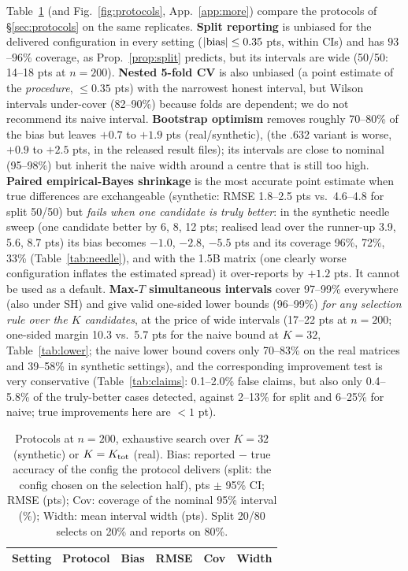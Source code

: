 Table~\ref{tab:protocols} (and Fig.~\ref{fig:protocols}, App.~\ref{app:more}) compare the protocols of \S\ref{sec:protocols} on the same replicates. 
\textbf{Split reporting} is unbiased for the delivered configuration in every setting ($|{\rm bias}|\le0.35$ pts, within CIs) and has $93$--$96\%$ coverage, as Prop.~\ref{prop:split} predicts, but its intervals are wide (50/50: 14--18 pts at $n=200$).
\textbf{Nested 5-fold CV} is also unbiased (a point estimate of the \emph{procedure}, $\le0.35$ pts) with the narrowest honest interval, but Wilson intervals under-cover (82--90\%) because folds are dependent; we do not recommend its naive interval.
\textbf{Bootstrap optimism} removes roughly 70--80\% of the bias but leaves $+0.7$ to $+1.9$ pts (real/synthetic), (the .632 variant is worse, $+0.9$ to $+2.5$ pts, in the released result files); its intervals are close to nominal (95--98\%) but inherit the naive width around a centre that is still too high.
\textbf{Paired empirical-Bayes shrinkage} is the most accurate point estimate when true differences are exchangeable (synthetic: RMSE 1.8--2.5 pts vs.\ 4.6--4.8 for split 50/50) but \emph{fails when one candidate is truly better}: in the synthetic needle sweep (one candidate better by 6, 8, 12 pts; realised lead over the runner-up 3.9, 5.6, 8.7 pts) its bias becomes $-1.0$, $-2.8$, $-5.5$ pts and its coverage 96\%, 72\%, 33\% (Table~\ref{tab:needle}), and with the 1.5B matrix (one clearly worse configuration inflates the estimated spread) it over-reports by $+1.2$ pts. It cannot be used as a default.
\textbf{Max-$T$ simultaneous intervals} cover 97--99\% everywhere (also under SH) and give valid one-sided lower bounds (96--99\%) \emph{for any selection rule over the $K$ candidates}, at the price of wide intervals (17--22 pts at $n=200$; one-sided margin 10.3 vs.\ 5.7 pts for the naive bound at $K{=}32$, Table~\ref{tab:lower}; the naive lower bound covers only 70--83\% on the real matrices and 39--58\% in synthetic settings), and the corresponding improvement test is very conservative (Table~\ref{tab:claims}: 0.1--2.0\% false claims, but also only 0.4--5.8\% of the truly-better cases detected, against 2--13\% for split and 6--25\% for naive; true improvements here are $<1$ pt).
\begin{table}[t]
\caption{Protocols at $n=200$, exhaustive search over $K=32$ (synthetic) or $K=K_{\rm tot}$ (real). Bias: reported $-$ true accuracy of the config the protocol delivers (split: the config chosen on the selection half), pts $\pm$ 95\% CI; RMSE (pts); Cov: coverage of the nominal 95\% interval (\%); Width: mean interval width (pts). Split 20/80 selects on 20\% and reports on 80\%.}\label{tab:protocols}
\centering\footnotesize\setlength{\tabcolsep}{3pt}
\begin{tabular}{llrrrr}
\toprule Setting & Protocol & Bias & RMSE & Cov & Width\\ \midrule
\end{tabular}
\end{table}

